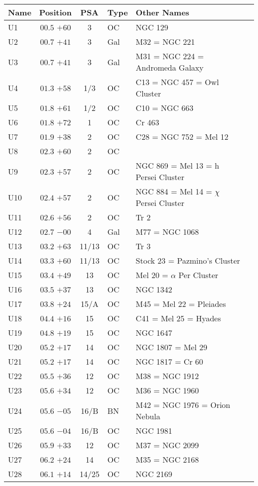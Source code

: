 \begin{table}[p]
\setlength{\tabcolsep}{3pt}
\small
\begin{tabular}{lcclll}
\hline
Name&Position&PSA&Type&Other Names\\
\hline
U1  &$00.5$ $+60$&3&OC &NGC 129\\
U2  &$00.7$ $+41$&3&Gal&M32 = NGC 221\\
U3  &$00.7$ $+41$&3&Gal&M31 = NGC 224 = Andromeda Galaxy\\
U4  &$01.3$ $+58$&1/3&OC &C13 = NGC 457 = Owl Cluster\\
U5  &$01.8$ $+61$&1/2&OC &C10 = NGC 663\\
U6  &$01.8$ $+72$&1&OC &Cr 463\\
U7  &$01.9$ $+38$&2&OC &C28 = NGC 752 = Mel 12\\
U8  &$02.3$ $+60$&2&OC &\\
U9  &$02.3$ $+57$&2&OC &NGC 869 = Mel 13 = h Persei Cluster\\
U10 &$02.4$ $+57$&2&OC &NGC 884 = Mel 14 = $\chi$ Persei Cluster\\
U11 &$02.6$ $+56$&2&OC &Tr 2\\
U12 &$02.7$ $-00$&4&Gal&M77 = NGC 1068\\
U13 &$03.2$ $+63$&11/13&OC &Tr 3\\
U14 &$03.3$ $+60$&11/13&OC &Stock 23 = Pazmino's Cluster\\
U15 &$03.4$ $+49$&13&OC &Mel 20 = $\alpha$ Per Cluster\\
U16 &$03.5$ $+37$&13&OC &NGC 1342\\
U17 &$03.8$ $+24$&15/A&OC &M45 = Mel 22 = Pleiades\\
U18 &$04.4$ $+16$&15&OC &C41 = Mel 25 = Hyades\\
U19 &$04.8$ $+19$&15&OC &NGC 1647\\
U20 &$05.2$ $+17$&14&OC &NGC 1807 = Mel 29\\
U21 &$05.2$ $+17$&14&OC &NGC 1817 = Cr 60\\
U22 &$05.5$ $+36$&12&OC &M38 = NGC 1912\\
U23 &$05.6$ $+34$&12&OC &M36 = NGC 1960\\
U24 &$05.6$ $-05$&16/B&BN &M42 = NGC 1976 = Orion Nebula\\
U25 &$05.6$ $-04$&16/B&OC &NGC 1981\\
U26 &$05.9$ $+33$&12&OC &M37 = NGC 2099\\
U27 &$06.2$ $+24$&14&OC &M35 = NGC 2168\\
U28 &$06.1$ $+14$&14/25&OC &NGC 2169\\

\end{tabular}
\end{table}
